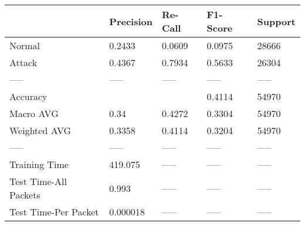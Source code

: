 \begin{tabular}{lllll}
\toprule
{} & Precision & Re-Call & F1-Score & Support \\
\midrule
Normal                &    0.2433 &  0.0609 &   0.0975 &   28666 \\
Attack                &    0.4367 &  0.7934 &   0.5633 &   26304 \\
-----                 &     ----- &   ----- &    ----- &   ----- \\
Accuracy              &           &         &   0.4114 &   54970 \\
Macro AVG             &      0.34 &  0.4272 &   0.3304 &   54970 \\
Weighted AVG          &    0.3358 &  0.4114 &   0.3204 &   54970 \\
-----                 &     ----- &   ----- &    ----- &   ----- \\
Training Time         &   419.075 &   ----- &    ----- &   ----- \\
Test Time-All Packets &     0.993 &   ----- &    ----- &   ----- \\
Test Time-Per Packet  &  0.000018 &   ----- &    ----- &   ----- \\
\bottomrule
\end{tabular}

